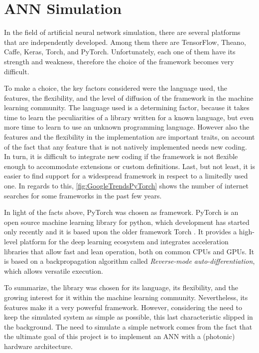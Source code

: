 
\section{ANN Simulation}
\label{sec:ANN_Simulation}
In the field of artificial neural network simulation, there are several platforms that are independently developed.
Among them there are TensorFlow, Theano, Caffe, Keras, Torch, and PyTorch.
Unfortunately, each one of them have its strength and weakness, therefore the choice of the framework becomes very difficult.

To make a choice, the key factors considered were the language used, the features, the flexibility, and the level of diffusion of the framework in the machine learning community.
The language used is a determining factor, because it takes time to learn the peculiarities of a library written for a known language, but even more time to learn to use an unknown programming language.
However also the features and the flexibility in the implementation are important traits, on account of the fact that any feature that is not natively implemented needs new coding.
In turn, it is difficult to integrate new coding if the framework is not flexible enough to accommodate extensions or custom definitions.
Last, but not least, it is easier to find support for a widespread framework in respect to a limitedly used one.
In regards to this, \autoref{fig:GoogleTrendsPyTorch} shows the number of internet searches for some frameworks in the past few years.

In light of the facts above, PyTorch was chosen as framework.
PyTorch is an open source machine learning library for python, which development has started only recently and it is based upon the older framework Torch  \cite{PyTorch.org}.
It provides a high-level platform for the deep learning ecosystem and integrates acceleration libraries that allow fast and lean operation, both on common \acsp{CPU} and \acsp{GPU}.
It is based on a backpropagation algorithm called \textit{Reverse-mode auto-differentiation}, which allows versatile execution.

To summarize, the library was chosen for its language, its flexibility, and the growing interest for it within the machine learning community.
Nevertheless, its features make it a very powerful framework. However, considering the need to keep the simulated system as simple as possible, this last characteristic slipped in the background.
The need to simulate a simple network comes from the fact that the ultimate goal of this project is to implement an \acs{ANN} with a (photonic) hardware architecture.

